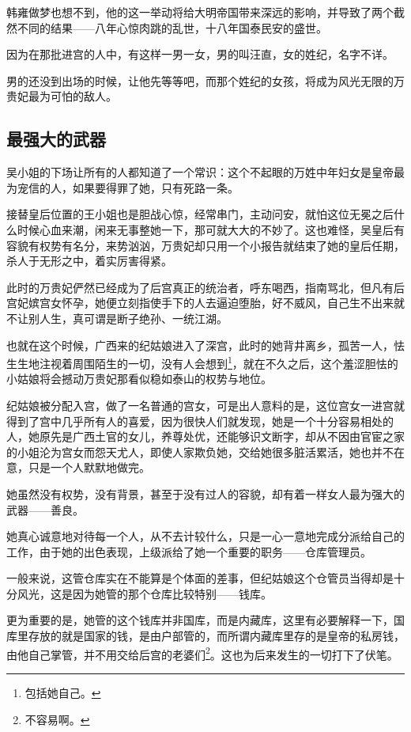 \begin{multicols}{\theparacolNo}
		韩雍做梦也想不到，他的这一举动将给大明帝国带来深远的影响，并导致了两个截然不同的结果——八年心惊肉跳的乱世，十八年国泰民安的盛世。

		因为在那批进宫的人中，有这样一男一女，男的叫汪直，女的姓纪，名字不详。

		男的还没到出场的时候，让他先等等吧，而那个姓纪的女孩，将成为风光无限的万贵妃最为可怕的敌人。

		\subsection{最强大的武器}
		吴小姐的下场让所有的人都知道了一个常识：这个不起眼的万姓中年妇女是皇帝最为宠信的人，如果要得罪了她，只有死路一条。

		接替皇后位置的王小姐也是胆战心惊，经常串门，主动问安，就怕这位无冕之后什么时候心血来潮，闲来无事整她一下，那可就大大的不妙了。这也难怪，吴皇后有容貌有权势有名分，来势汹汹，万贵妃却只用一个小报告就结束了她的皇后任期，杀人于无形之中，着实厉害得紧。

		此时的万贵妃俨然已经成为了后宫真正的统治者，呼东喝西，指南骂北，但凡有后宫妃嫔宫女怀孕，她便立刻指使手下的人去逼迫堕胎，好不威风，自己生不出来就不让别人生，真可谓是断子绝孙、一统江湖。

		也就在这个时候，广西来的纪姑娘进入了深宫，此时的她背井离乡，孤苦一人，怯生生地注视着周围陌生的一切，没有人会想到\footnote{包括她自己。}，就在不久之后，这个羞涩胆怯的小姑娘将会撼动万贵妃那看似稳如泰山的权势与地位。

		纪姑娘被分配入宫，做了一名普通的宫女，可是出人意料的是，这位宫女一进宫就得到了宫中几乎所有人的喜爱，因为很快人们就发现，她是一个十分容易相处的人，她原先是广西土官的女儿，养尊处优，还能够识文断字，却从不因由官宦之家的小姐沦为宫女而怨天尤人，即使人家欺负她，交给她很多脏活累活，她也并不在意，只是一个人默默地做完。

		她虽然没有权势，没有背景，甚至于没有过人的容貌，却有着一样女人最为强大的武器——善良。

		她真心诚意地对待每一个人，从不去计较什么，只是一心一意地完成分派给自己的工作，由于她的出色表现，上级派给了她一个重要的职务——仓库管理员。

		一般来说，这管仓库实在不能算是个体面的差事，但纪姑娘这个仓管员当得却是十分风光，这是因为她管的那个仓库比较特别——钱库。

		更为重要的是，她管的这个钱库并非国库，而是内藏库，这里有必要解释一下，国库里存放的就是国家的钱，是由户部管的，而所谓内藏库里存的是皇帝的私房钱，由他自己掌管，并不用交给后宫的老婆们\footnote{不容易啊。}。这也为后来发生的一切打下了伏笔。


\end{multicols}
